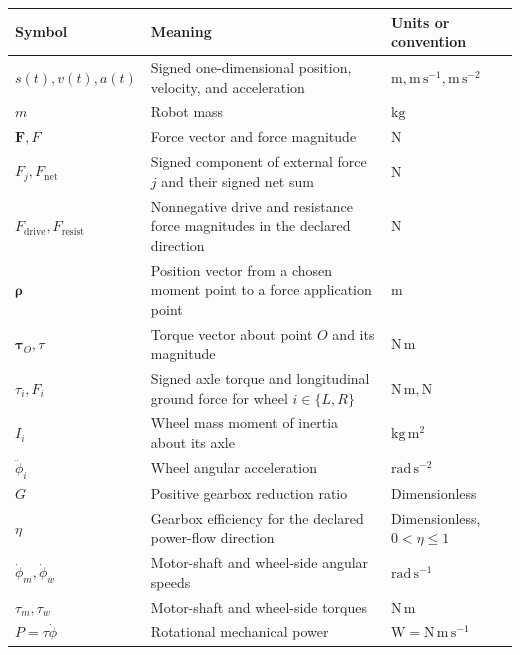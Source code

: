 \documentclass[
  australian,
  12pt,
  letterpaper,
  DIV=11,
  numbers=noendperiod,
  twoside]{scrreprt}
\newcounter{none} %
\begin{document}
{\def\LTcaptype{none} %
\begin{longtable}[]{@{}
  >{\raggedright\arraybackslash}p{}
  >{\raggedright\arraybackslash}p{}
  >{\raggedright\arraybackslash}p{}@{}}
\toprule\noalign{}
\begin{minipage}[b]{\linewidth}\raggedright
Symbol
\end{minipage} & \begin{minipage}[b]{\linewidth}\raggedright
Meaning
\end{minipage} & \begin{minipage}[b]{\linewidth}\raggedright
Units or convention
\end{minipage} \\
\midrule\noalign{}
\endhead
\bottomrule\noalign{}
\endlastfoot
\(s(t),v(t),a(t)\) & Signed one-dimensional position, velocity, and
acceleration & \(\mathrm m,\mathrm{m\,s^{-1}},\mathrm{m\,s^{-2}}\) \\
\(m\) & Robot mass & \(\mathrm{kg}\) \\
\(\mathbf F,F\) & Force vector and force magnitude & \(\mathrm N\) \\
\(F_j,F_{\mathrm{net}}\) & Signed component of external force \(j\) and
their signed net sum & \(\mathrm N\) \\
\(F_{\mathrm{drive}},F_{\mathrm{resist}}\) & Nonnegative drive and
resistance force magnitudes in the declared direction & \(\mathrm N\) \\
\(\boldsymbol\rho\) & Position vector from a chosen moment point to a
force application point & \(\mathrm m\) \\
\(\boldsymbol\tau_O,\tau\) & Torque vector about point \(O\) and its
magnitude & \(\mathrm{N\,m}\) \\
\(\tau_i,F_i\) & Signed axle torque and longitudinal ground force for
wheel \(i\in\{L,R\}\) & \(\mathrm{N\,m},\mathrm N\) \\
\(I_i\) & Wheel mass moment of inertia about its axle &
\(\mathrm{kg\,m^2}\) \\
\(\ddot\phi_i\) & Wheel angular acceleration &
\(\mathrm{rad\,s^{-2}}\) \\
\(G\) & Positive gearbox reduction ratio & Dimensionless \\
\(\eta\) & Gearbox efficiency for the declared power-flow direction &
Dimensionless, \(0<\eta\leq1\) \\
\(\dot\phi_m,\dot\phi_w\) & Motor-shaft and wheel-side angular speeds &
\(\mathrm{rad\,s^{-1}}\) \\
\(\tau_m,\tau_w\) & Motor-shaft and wheel-side torques &
\(\mathrm{N\,m}\) \\
\(P=\tau\dot\phi\) & Rotational mechanical power &
\(\mathrm W=\mathrm{N\,m\,s^{-1}}\) \\
\end{longtable}
}
\end{document}
